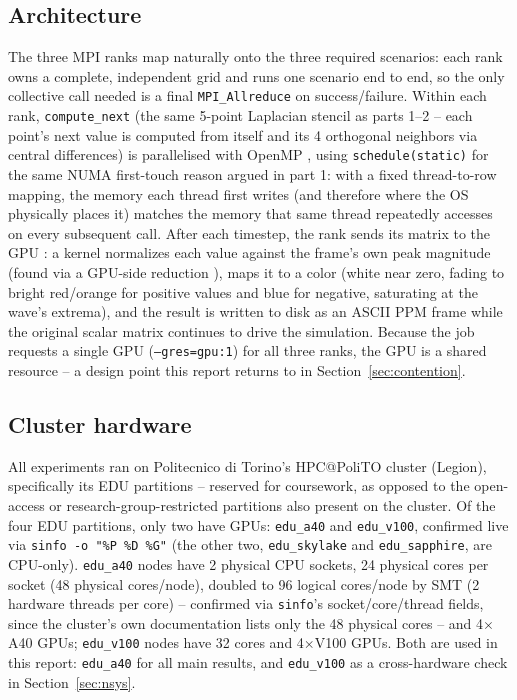 \subsection{Architecture}
The three MPI
ranks \cite{sanchezmpiintro} map naturally onto the three required
scenarios: each rank owns a complete, independent grid and runs one
scenario end to end, so the only collective call needed is a final
\texttt{MPI\_Allreduce} on success/failure. Within each rank, \texttt{compute\_next}
(the same 5-point Laplacian stencil as parts 1--2 -- each point's next
value is computed from itself and its 4 orthogonal neighbors via central
differences) is parallelised with OpenMP \cite{slidestatic}, using
\texttt{schedule(static)} for the same NUMA first-touch reason argued in
part 1: with a fixed thread-to-row mapping, the memory each thread first
writes (and therefore where the OS physically places it) matches the
memory that same thread repeatedly accesses on every subsequent call. After each timestep, the rank sends its
matrix to the GPU \cite{sanchezcuda}: a kernel normalizes each value
against the frame's own peak magnitude (found via a GPU-side reduction
\cite{sanchezgpuintro}), maps it to a color (white near zero, fading to
bright red/orange for positive values and blue for negative, saturating
at the wave's extrema), and the result is written to disk as an ASCII
PPM frame while the original scalar matrix continues to drive the
simulation.
Because the job requests a single GPU (\texttt{--gres=gpu:1}) for all
three ranks, the GPU is a shared resource -- a design point this report
returns to in Section~\ref{sec:contention}.

\subsection{Cluster hardware}
All experiments ran on Politecnico di Torino's HPC@PoliTO cluster
(Legion), specifically its EDU partitions -- reserved for coursework,
as opposed to the open-access or research-group-restricted partitions
also present on the cluster. Of the four EDU partitions, only two have
GPUs: \texttt{edu\_a40} and \texttt{edu\_v100}, confirmed live via
\texttt{sinfo -o "\%P \%D \%G"} (the other two, \texttt{edu\_skylake}
and \texttt{edu\_sapphire}, are CPU-only). \texttt{edu\_a40} nodes have 2 physical CPU sockets, 24 physical cores
per socket (48 physical cores/node), doubled to 96 logical cores/node by
SMT (2 hardware threads per core) -- confirmed via \texttt{sinfo}'s
socket/core/thread fields, since the cluster's own documentation lists
only the 48 physical cores -- and 4$\times$A40 GPUs;
\texttt{edu\_v100} nodes have 32 cores and 4$\times$V100 GPUs. Both are
used in this report: \texttt{edu\_a40} for all main results, and
\texttt{edu\_v100} as a cross-hardware check in Section~\ref{sec:nsys}.

